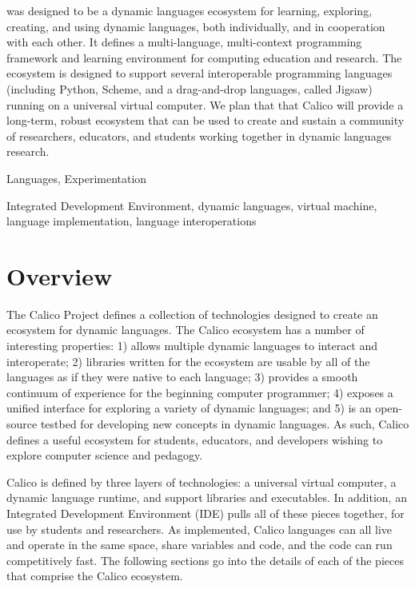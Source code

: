 \documentclass[preprint]{sigplanconf}
\begin{document}
was designed to be a dynamic languages ecosystem
for learning, exploring, creating, and using dynamic languages, both
individually, and in cooperation with each other. It defines a
multi-language, multi-context programming framework and learning
environment for computing education and research. The ecosystem is
designed to support several interoperable programming languages
(including Python, Scheme, and a drag-and-drop languages, called
Jigsaw) running on a universal virtual computer.  We plan that that
Calico will provide a long-term, robust ecosystem that can be used to
create and sustain a community of researchers, educators, and students
working together in dynamic languages research.


\terms
Languages, Experimentation

\keywords 
Integrated Development Environment, dynamic languages,
virtual machine, language implementation, language interoperations

\section{Overview}

The Calico Project defines a collection of technologies designed to
create an ecosystem for dynamic languages. The Calico ecosystem has a
number of interesting properties: 1) allows multiple dynamic languages
to interact and interoperate; 2) libraries written for the ecosystem
are usable by all of the languages as if they were native to each
language; 3) provides a smooth continuum of experience for the
beginning computer programmer; 4) exposes a unified interface for
exploring a variety of dynamic languages; and 5) is an open-source
testbed for developing new concepts in dynamic languages. As such,
Calico defines a useful ecosystem for students, educators, and
developers wishing to explore computer science and pedagogy.

Calico is defined by three layers of technologies: a universal virtual
computer, a dynamic language runtime, and support libraries and
executables. In addition, an Integrated Development Environment (IDE)
pulls all of these pieces together, for use by students and researchers. As
implemented, Calico languages can all live and operate in the same
space, share variables and code, and the code can run competitively
fast. The following sections go into the details of each of the pieces
that comprise the Calico ecosystem.
\end{document}
